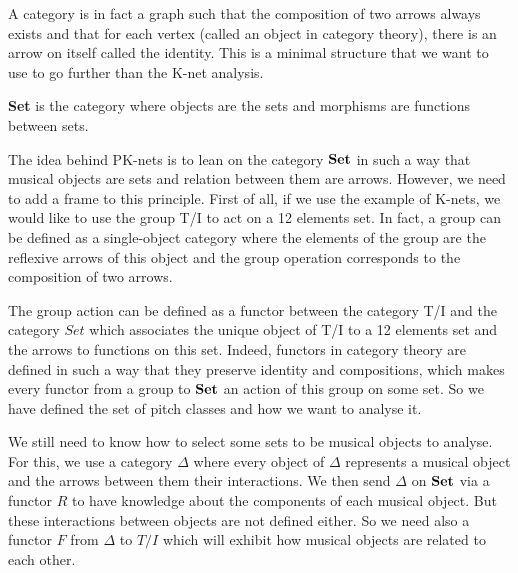 A category is in fact a graph such that the composition of two arrows always exists and that for each vertex (called an object in category theory), there is an arrow on itself called the identity. This is a minimal structure that we want to use to go further than the K-net analysis.

\begin{defn}\textbf{Set}\label{nomencl:Set} is the category where objects are the sets and morphisms are functions between sets.
\end{defn}



The idea behind PK-nets is to lean on the category $\bf Set$ in such a way that musical objects are sets and relation between them are arrows. However, we need to add a frame to this principle. First of all, if we use the example of K-nets, we would like to use the group T/I to act on a 12 elements set. In fact, a group can be defined as a single-object category where the elements of the group are the reflexive arrows of this object and the group operation corresponds to the composition of two arrows.

The group action can be defined as a functor between the category T/I and the category $Set$ which associates the unique object of T/I to a 12 elements set and the arrows to functions on this set. Indeed, functors in category theory are defined in such a way that they preserve identity and compositions, which makes every functor from a group to $\bf Set$ an action of this group on some set. So we have defined the set of pitch classes and how we want to analyse it.

We still need to know how to select some sets to be musical objects to analyse. For this, we use a category $\Delta$ where every object of $\Delta$ represents a musical object and the arrows between them their interactions. We then send  $\Delta$ on $\bf Set$ via a functor $R$ to have knowledge about the components of each musical object. But these interactions between objects are not defined either. So we need also a functor $F$ from $\Delta$ to $T/I$ which will exhibit how musical objects are related to each other.


